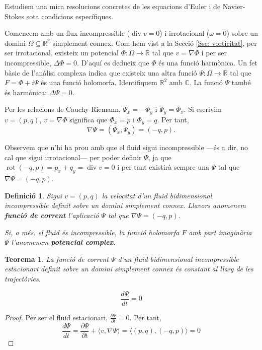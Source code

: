 \documentclass{article}
\numberwithin{equation}{section}
\DeclareMathOperator{\diver}{div}
\DeclareMathOperator{\rot}{rot}
\newtheorem{teorema}{Teorema}[section]
\newtheorem{definicio}{Definici\'{o}}[section]
\begin{document}
Estudiem una mica resolucions concretes de les equacions d'Euler i de Navier-Stokes sota condicions espec\'{i}fiques.

Comencem amb un flux incompressible ($\diver v=0$) i irrotacional ($\omega=0$) sobre un domini $\Omega\subseteq\mathbb{R}^2$ simplement connex. Com hem vist a la Secci\'{o} \ref{Sse: vorticitat}, per ser irrotacional, existeix un potencial $\Phi:\Omega\rightarrow\mathbb{R}$ tal que $v=\nabla\Phi$ i per ser incompressible, $\Delta\Phi=0$. D'aqu\'{i} es dedueix que $\Phi$ \'{e}s una funci\'{o} harm\`{o}nica. Un fet b\`{a}sic de l'an\`{a}lisi complexa indica que existeix una altra funci\'{o} $\Psi:\Omega\rightarrow\mathbb{R}$ tal que $F=\Phi+i\Psi$ \'{e}s una funci\'{o} holomorfa. Identifiquem $\mathbb{R}^2$ amb $\mathbb{C}$. La funci\'{o} $\Psi$ tamb\'{e} \'{e}s harm\`{o}nica: $\Delta\Psi=0$.

Per les relacions de Cauchy-Riemann, $\Psi_x=-\Phi_y$ i $\Psi_y=\Phi_x$. Si escrivim $v=(p,q)$, $v=\nabla\Phi$ significa que $\Phi_x=p$ i $\Phi_y=q$. Per tant,
\[\nabla\Psi=(\Psi_x,\Psi_y)=(-q,p).\]

Observem que n'hi ha prou amb que el fluid sigui incompressible ---\'{e}s a dir, no cal que sigui irrotacional--- per poder definir $\Psi$, ja que $\rot(-q,p)=p_x+q_y=\diver v=0$ i per tant existir\`{a} sempre una $\Psi$ tal que $\nabla\Psi=(-q,p)$.

\begin{definicio}
Sigui $v=(p,q)$ la velocitat d'un fluid bidimensional incompressible definit sobre un domini simplement connex. Llavors anomenem \textbf{funci\'{o} de corrent} l'aplicaci\'{o} $\Psi$ tal que $\nabla\Psi=(-q,p)$.

Si, a m\'{e}s, el fluid \'{e}s incompressible, la funci\'{o} holomorfa $F$ amb part imagin\`{a}ria $\Psi$ l'anomenem \textbf{potencial complex}.
\end{definicio}

\begin{teorema}
La funci\'{o} de corrent $\Psi$ d'un fluid bidimensional incompressible estacionari definit sobre un domini simplement connex \'{e}s constant al llarg de les traject\`{o}ries.

\[\frac{d\Psi}{dt}=0\]
\end{teorema}
\begin{proof}
Per ser el fluid estacionari, $\frac{\partial\Psi}{\partial t}=0$. Per tant,
\[\frac{d\Psi}{dt}=\frac{\partial\Psi}{\partial t}+\langle v,\nabla\Psi\rangle=\langle(p,q),(-q,p)\rangle=0\]
\end{proof}
\end{document}
